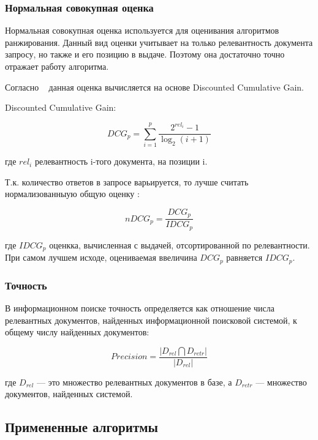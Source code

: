 \subsubsection{Нормальная совокупная оценка}

Нормальная совокупная оценка используется для оценивания алгоритмов ранжирования. Данный вид оценки учитывает на только релевантность документа запросу, но также и его позицию в выдаче. Поэтому она достаточно точно отражает работу алгоритма.

Согласно ~\cite{ndcg_book} данная оценка вычисляется на основе Discounted Cumulative Gain. 

Discounted Cumulative Gain:

\begin{equation}
	DCG_p=\sum_{i=1}^{p}\frac{2^{{rel}_i}-1}{\log_2(i+1)}
\end{equation}

где ${rel}_i$ релевантность i-того документа, на позиции i. 

Т.к. количество ответов в запросе варьируется, то лучше считать нормализованныую общую оценку :

\begin{equation}
	{nDCG}_p=\frac{{DCG}_p}{{IDCG}_p}
\end{equation}

где ${{IDCG}_p}$ оценкка, вычисленная с выдачей, отсортированной по релевантности. При самом лучшем исходе, оцениваемая ввеличина ${{DCG}_p}$ равняется ${{IDCG}_p}$. 

\subsubsection{Точность}

В информационном поиске точность определяется как отношение числа релевантных документов, найденных информационной поисковой системой, к общему числу найденных документов:

\begin{equation}
  {Precision}=\frac{|D_{rel}\bigcap D_{retr}|}{|D_{rel}|}
\end{equation}

где $D_{rel}$ — это множество релевантных документов в базе, а $D_{retr}$ — множество документов, найденных системой. 

\subsection{Примененные алгоритмы}

